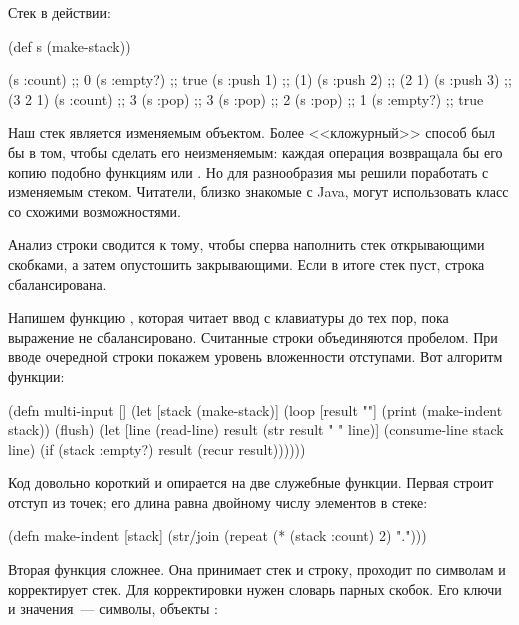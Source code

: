 Стек в действии:

\begin{english}
  \begin{clojure}
(def s (make-stack))

(s :count)  ;; 0
(s :empty?) ;; true
(s :push 1) ;; (1)
(s :push 2) ;; (2 1)
(s :push 3) ;; (3 2 1)
(s :count)  ;; 3
(s :pop)    ;; 3
(s :pop)    ;; 2
(s :pop)    ;; 1
(s :empty?) ;; true
  \end{clojure}
\end{english}

Наш стек является изменяемым объектом. Более <<кложурный>> способ был бы в том, чтобы сделать его неизменяемым: каждая операция возвращала бы его копию подобно функциям  или . Но для разнообразия мы решили поработать с изменяемым стеком. Читатели, близко знакомые с Java, могут использовать класс  со схожими возможностями.

Анализ строки сводится к тому, чтобы сперва наполнить стек открывающими скобками, а затем опустошить закрывающими. Если в итоге стек пуст, строка сбалансирована.

Напишем функцию , которая читает ввод с клавиатуры до тех пор, пока выражение не сбалансировано. Считанные строки объединяются пробелом. При вводе очередной строки покажем уровень вложенности отступами. Вот алгоритм функции:

\begin{english}
  \begin{clojure}
(defn multi-input []
  (let [stack (make-stack)]
    (loop [result ""]
      (print (make-indent stack))
      (flush)
      (let [line (read-line)
            result (str result " " line)]
        (consume-line stack line)
        (if (stack :empty?)
          result
          (recur result))))))
  \end{clojure}
\end{english}

Код довольно короткий и опирается на две служебные функции. Первая  строит отступ из точек; его длина равна двойному числу элементов в стеке:

\begin{english}
  \begin{clojure}
(defn make-indent [stack]
  (str/join (repeat (* (stack :count) 2) ".")))
  \end{clojure}
\end{english}

Вторая функция  сложнее. Она принимает стек и строку, проходит по символам и корректирует стек. Для корректировки нужен словарь парных скобок. Его ключи и значения~--- символы, объекты :

